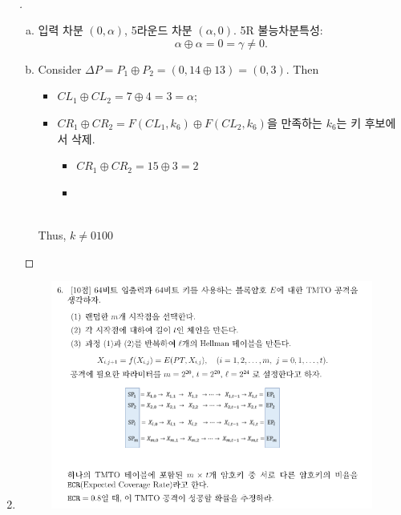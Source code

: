 \begin{enumerate}[\bf 1.]
\begin{figure}[h!]
	\end{figure}\
	\begin{proof}[\sol]
		\ \begin{enumerate}[(a)]
			\item 입력 차분 $(0,\alpha)$, 5라운드 차분 $(\alpha,0)$. 5R 불능차분특성: \[
			\alpha\oplus\alpha=0=\gamma\neq 0.
			\]
			\item Consider $\Delta P=P_1\oplus P_2=(0,14\oplus 13)=(0,3)$. Then\begin{itemize}
				\item $CL_1\oplus CL_2=7\oplus 4=3=\alpha$;
				\item $CR_1\oplus CR_2=F(CL_1,k_6)\oplus F(CL_2,k_6)$을 만족하는 $k_6$는 키 후보에서 삭제.
				\begin{itemize}
					\item $CR_1\oplus CR_2=15\oplus 3=2$
					\item \ \\ 
				\end{itemize}
			\end{itemize}\ \\ Thus, $k\neq 0100$
		\end{enumerate}
	\end{proof}
	\newpage
	\item[]
	\begin{figure}[h!]\centering
		\includegraphics[scale=.55]{final2023-6}

\end{figure}
\end{enumerate}
